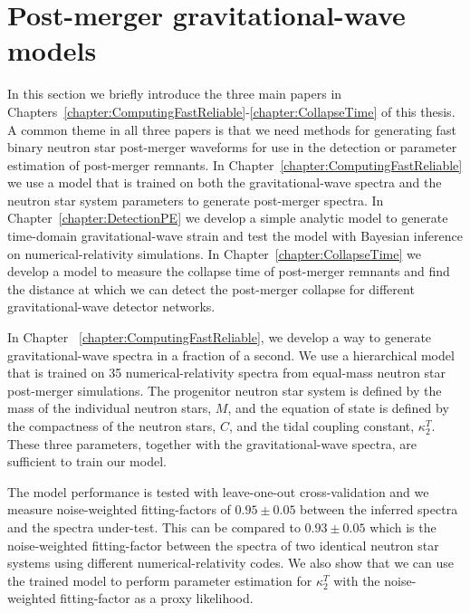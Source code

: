 \documentclass[../Thesis.tex]{subfiles}
\begin{document}
    \section{Post-merger gravitational-wave models} 
    \label{sec:Intro:Models}
    In this section we briefly introduce the three main papers in Chapters~\ref{chapter:ComputingFastReliable}-\ref{chapter:CollapseTime} of this thesis. 
    A common theme in all three papers is that we need methods for generating fast binary neutron star post-merger waveforms for use in the detection or parameter estimation of post-merger remnants.
    In Chapter~\ref{chapter:ComputingFastReliable} we use a model that is trained on both the gravitational-wave spectra and the neutron star system parameters to generate post-merger spectra.
    In Chapter~\ref{chapter:DetectionPE} we develop a simple analytic model to generate time-domain gravitational-wave strain and test the model with Bayesian inference on numerical-relativity simulations.
    In Chapter~\ref{chapter:CollapseTime} we develop a model to measure the collapse time of post-merger remnants and find the distance at which we can detect the post-merger collapse for different gravitational-wave detector networks.
    
    In Chapter ~\ref{chapter:ComputingFastReliable}, we develop a way to generate gravitational-wave spectra in a fraction of a second.
    We use a hierarchical model that is trained on 35 numerical-relativity spectra from equal-mass neutron star post-merger simulations.
    The progenitor neutron star system is defined by the mass of the individual neutron stars, $M$, and the equation of state is defined by the compactness of the neutron stars, $C$, and the tidal coupling constant, $\kappa_2^T$.
    These three parameters, together with the gravitational-wave spectra, are sufficient to train our model. \par
    
    The model performance is tested with leave-one-out cross-validation and we measure noise-weighted fitting-factors of $0.95\pm 0.05$ between the inferred spectra and the spectra under-test.
    This can be compared to $0.93\pm 0.05$ which is the noise-weighted fitting-factor between the spectra of two identical neutron star systems using different numerical-relativity codes.
    We also show that we can use the trained model to perform parameter estimation for $\kappa_2^T$ with the noise-weighted fitting-factor as a proxy likelihood.
    
\end{document}
